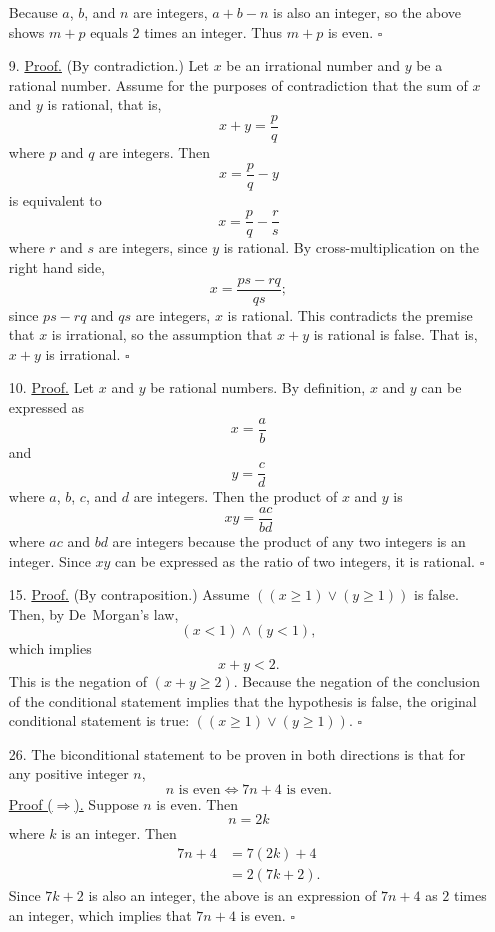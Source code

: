 \documentclass{article}
\begin{document}
\begin{enumerate}
    Because $a$, $b$, and $n$ are integers, $a+b-n$ is also an integer, so the above shows $m+p$ equals $2$ times an integer. Thus $m+p$ is even. $\square$ 
    \item[9.] \underline{Proof.} (By contradiction.) Let $x$ be an irrational number and $y$ be a rational number. Assume for the purposes of contradiction that the sum of $x$ and $y$ is rational, that is,
    \[
    x + y = \frac{p}{q}
    \]
    where $p$ and $q$ are integers. Then
    \[
    x = \frac{p}{q} - y
    \]
    is equivalent to
    \[
    x = \frac{p}{q} - \frac{r}{s}
    \]
    where $r$ and $s$ are integers, since $y$ is rational. By cross-multiplication on the right hand side,
    \[
    x = \frac{ps - rq}{qs};
    \]
    since $ps-rq$ and $qs$ are integers, $x$ is rational. This contradicts the premise that $x$ is irrational, so the assumption that $x+y$ is rational is false. That is, $x+y$ is irrational. $\square$
    \item[10.] \underline{Proof.} Let $x$ and $y$ be rational numbers. By definition, $x$ and $y$ can be expressed as
    \[
    x = \frac{a}{b}
    \]
    and
    \[
    y = \frac{c}{d}
    \]
    where $a$, $b$, $c$, and $d$ are integers. Then the product of $x$ and $y$ is
    \[
    xy = \frac{ac}{bd}
    \]
    where $ac$ and $bd$ are integers because the product of any two integers is an integer. Since $xy$ can be expressed as the ratio of two integers, it is rational. $\square$
    \item[15.] \underline{Proof.} (By contraposition.) Assume $((x \ge 1) \lor (y \ge 1))$ is false. Then, by De~Morgan's law,
    \[
    (x < 1) \land (y < 1),
    \]
    which implies
    \[
    x + y < 2.
    \]
    This is the negation of $(x + y \ge 2)$. Because the negation of the conclusion of the conditional statement implies that the hypothesis is false, the original conditional statement is true: $((x \ge 1) \lor (y \ge 1))$. $\square$
    \item[26.] The biconditional statement to be proven in both directions is that for any positive integer $n$,
    \[
    n \textrm{ is even} \Leftrightarrow 7n+4 \textrm{ is even.}
    \]
    \underline{Proof ($\Rightarrow$).} Suppose $n$ is even. Then
    \[
    n = 2k
    \]
    where $k$ is an integer. Then
    \begin{align*}
    7n+4 &= 7(2k)+4 \\
    &= 2(7k+2).
    \end{align*}
    Since $7k+2$ is also an integer, the above is an expression of $7n+4$ as $2$ times an integer, which implies that $7n+4$ is even. $\square$


\end{enumerate}
\end{document}
